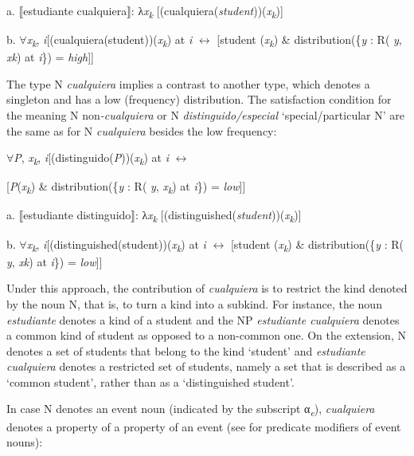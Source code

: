 \documentclass[output=paper]{langscibook}
\begin{document}
  a.  ⟦estudiante cualquiera⟧: λ\textit{x\textsubscript{k}} [(cualquiera(\textit{student}))(\textit{x\textsubscript{k}})]

  b.  ${\forall}$\textit{x\textsubscript{k}}, \textit{i}[(cualquiera(student))(\textit{x\textsubscript{k}}) at \textit{i} $\leftrightarrow $ [student (\textit{x\textsubscript{k}}) \& distribution(\{\textit{y} : R( \textit{y}, \textit{xk}) at \textit{i}\}) = \textit{high}]]

The type N \textit{cualquiera} implies a contrast to another type, which denotes a singleton and has a low (frequency) distribution. The satisfaction condition for the meaning N non\textit{{}-cualquiera} or N \textit{distinguido/especial} ‘special/particular N’ are the same as for N \textit{cualquiera} besides the low frequency:

    ${\forall}$\textit{P}, \textit{x\textsubscript{k}}, \textit{i}[(distinguido(\textit{P}))(\textit{x\textsubscript{k}}) at \textit{i} $\leftrightarrow $

    [\textit{P}(\textit{x\textsubscript{k}}) \& distribution(\{\textit{y} : R( \textit{y}, \textit{x\textsubscript{k}}) at \textit{i}\}) = \textit{low}]]

  a.  ⟦estudiante distinguido⟧: λ\textit{x\textsubscript{k}} [(distinguished(\textit{student}))(\textit{x\textsubscript{k}})]

  b.  ${\forall}$\textit{x\textsubscript{k}}, \textit{i}[(distinguished(student))(\textit{x\textsubscript{k}}) at \textit{i} $\leftrightarrow $ [student (\textit{x\textsubscript{k}}) \& distribution(\{\textit{y} : R( \textit{y}, \textit{xk}) at \textit{i}\}) = \textit{low}]]

Under this approach, the contribution of \textit{cualquiera} is to restrict the kind denoted by the noun N, that is, to turn a kind into a subkind. For instance, the noun \textit{estudiante} denotes a kind of a student and the NP \textit{estudiante cualquiera} denotes a common kind of student as opposed to a non-common one. On the extension, N denotes a set of students that belong to the kind ‘student’ and \textit{estudiante cualquiera} denotes a restricted set of students, namely a set that is described as a ‘common student’, rather than as a ‘distinguished student’. 

  In case N denotes an event noun (indicated by the subscript α\textit{\textsubscript{e}}), \textit{cualquiera} denotes a property of a property of an event (see \citealt{GehrkeMcNally2015} for predicate modifiers of event nouns):
\end{document}

